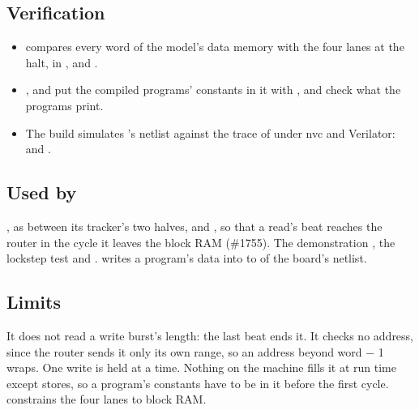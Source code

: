 \subsection*{Verification}

\begin{itemize}
\item {} compares every word of the model's
data memory with the four lanes at the halt, in ,
 and .
\item {}, 
and  put the compiled programs'
constants in it with , and check what the programs
print.
\item The build simulates 's netlist against the trace
of  under nvc and Verilator:
\allowbreak{} and
.
\end{itemize}

\subsection*{Used by}

, as  between its tracker's two halves,
 and , so that a read's beat reaches the
router in the cycle it leaves the block RAM (\#1755). The
demonstration , the lockstep test and
.  writes a program's data into
 to  of the board's netlist.

\subsection*{Limits}

It does not read a write burst's length: the last beat ends it. It
checks no address, since the router sends it only its own range, so
an address beyond word  $-$ 1 wraps. One write is held at a time. Nothing
on the machine fills it at run time except stores, so a program's
constants have to be in it before the first cycle.
 constrains the four lanes to block
RAM.
